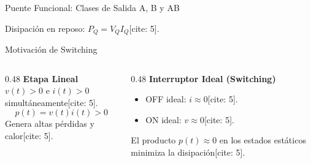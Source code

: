 \documentclass[aspectratio=169, table]{beamer}
\begin{document}
\begin{frame}{Puente Funcional: Clases de Salida A, B y AB}
    \begin{table}[]
        \centering
        \renewcommand{\arraystretch}{1.2}
    \end{table}
    
    \vspace{-0.1cm}
    \begin{center}
        Disipación en reposo: $P_Q = V_Q I_Q$[cite: 5].
    \end{center}
\end{frame}

\begin{frame}{Motivación de Switching}
    \begin{columns}
        \begin{column}{0.48\textwidth}
            \textbf{Etapa Lineal} \\
            $v(t) > 0$ e $i(t) > 0$ simultáneamente[cite: 5].
            \begin{equation*}
                p(t) = v(t)i(t) > 0
            \end{equation*}
            Genera altas pérdidas y calor[cite: 5].
        \end{column}
        \begin{column}{0.48\textwidth}
            \textbf{Interruptor Ideal (Switching)} \\
            \begin{itemize}
                \item OFF ideal: $i \approx 0$[cite: 5].
                \item ON ideal: $v \approx 0$[cite: 5].
            \end{itemize}
            El producto $p(t) \approx 0$ en los estados estáticos minimiza la disipación[cite: 5].
        \end{column}
    \end{columns}
\end{frame}
\end{document}
